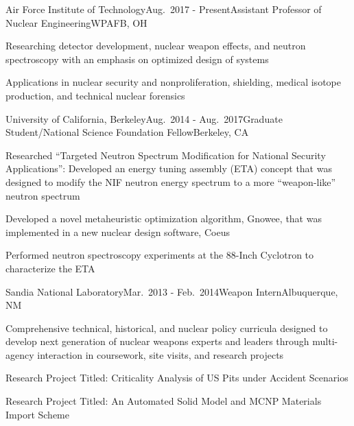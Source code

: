 \begin{rSubsection}{Air Force Institute of Technology}{Aug.\ 2017 - Present}{Assistant Professor of Nuclear Engineering}{WPAFB, OH}
\item Researching detector development, nuclear weapon effects, and neutron spectroscopy with an emphasis on optimized design of systems
\item Applications in nuclear security and nonproliferation, shielding, medical isotope production, and technical nuclear forensics
\end{rSubsection}

\begin{rSubsection}{University of California, Berkeley}{Aug.\ 2014 - Aug.\ 2017}{Graduate Student/National Science Foundation Fellow}{Berkeley, CA}
\item Researched \enquote{Targeted Neutron Spectrum Modification for National Security Applications}: Developed an energy tuning assembly (ETA) concept that was designed to modify the NIF neutron energy spectrum to a more \enquote{weapon-like} neutron spectrum
\item Developed a novel metaheuristic optimization algorithm, Gnowee, that was implemented in a new nuclear design software, Coeus
\item Performed neutron spectroscopy experiments at the 88-Inch Cyclotron to characterize the ETA %
\end{rSubsection}


\begin{rSubsection}{Sandia National Laboratory}{Mar.\ 2013 - Feb.\ 2014}{Weapon Intern}{Albuquerque, NM}
\item Comprehensive technical, historical, and nuclear policy curricula designed to develop next generation of nuclear weapons experts and leaders through multi-agency interaction in coursework, site visits, and research projects
\item Research Project Titled: Criticality Analysis of US Pits under Accident Scenarios
\item Research Project Titled: An Automated Solid Model and MCNP Materials Import Scheme
\end{rSubsection}


